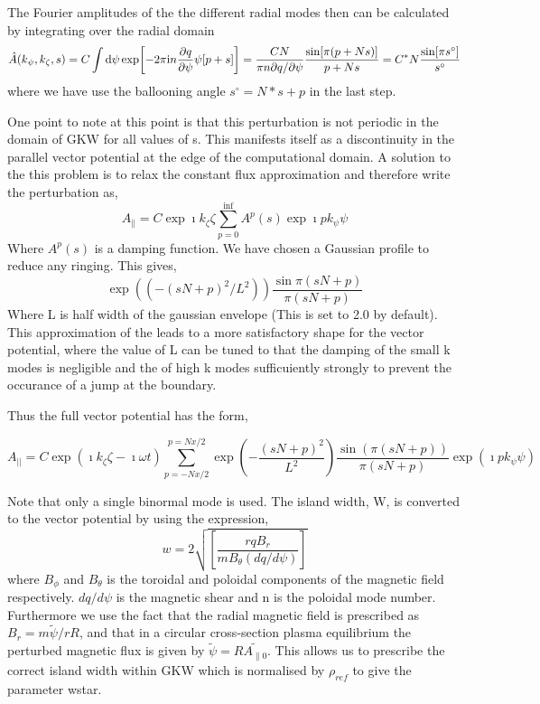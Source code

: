 \documentclass{report}
\def\be{\begin{equation}}
\def\ee{\end{equation}}
\begin{document}
The Fourier amplitudes of the the different radial modes then can be calculated by integrating over 
the radial domain 
\be 
\hat{A}(k_\psi, k_\zeta, s) = C \int {\rm d} \psi \exp \biggl [ - 2 \pi {\rm i} n {\partial q \over \partial \psi}
\psi [ p + s] \biggr ] 
= {C N \over \pi n \partial q / \partial \psi} {\sin [ \pi (p + Ns) ] \over p + Ns } 
= C^*N {\sin [ \pi s^\circ ] \over s^\circ} 
\ee 
where we have use the ballooning angle $s^\circ = N*s + p$ in the last step.

One point to note at this point is that this perturbation is not periodic in the domain of GKW for all values of s.  This manifests itself as a discontinuity in the parallel vector potential at the edge of the computational domain.  A solution to the this problem is to relax the constant flux approximation and therefore write the perturbation as,
\be 
A_\parallel = C \exp{\imath k_{\zeta}\zeta}\sum_{p=0}^{\inf} A^{p}(s)\exp{\imath pk_{\psi}\psi}
\ee  
Where $A^{p}(s)$ is a damping function.  We have chosen a Gaussian profile to reduce any ringing.  This gives,
\be
\exp{\left((-(sN+p)^{2}/L^{2})\right)}\frac{\sin{\pi(sN+p)}}{\pi(sN+p)}
\ee
Where L is half width of the gaussian envelope (This is set to 2.0 by default).  This approximation of the leads to a more satisfactory shape for the vector potential, where the value of L can be tuned to that the damping of the small k modes is negligible and the of high k modes sufficuiently strongly to prevent the occurance of a jump at the boundary.

Thus the full vector potential has the form,

\be
A_{||} = C\exp{(\imath k_{\zeta}\zeta - \imath\omega t)}\sum_{p=-Nx/2}^{p=Nx/2}\exp{\left(-\frac{(sN+p)^2}{L^2}\right)}\frac{\sin{(\pi(sN+p))}}{\pi(sN+p)}\exp{(\imath p k_{\psi}\psi)}
\ee

Note that only a single binormal mode is used.  The island width, W, is converted to the vector potential by using the expression,
\be
w = 2\sqrt{\left[\frac{rqB_{r}}{mB_{\theta}(dq/d\psi)}\right]}
\ee
where $B_{\phi}$ and $B_{\theta}$ is the toroidal and poloidal components of the magnetic field respectively.  $dq/d\psi$ is the magnetic shear and n is the poloidal mode number.  Furthermore we use the fact that the radial magnetic field is prescribed as $B_{r}= m\tilde{\psi} /rR$, and that in a circular cross-section plasma equilibrium the perturbed magnetic flux is given by $\tilde{\psi} = R\tilde{A_{\parallel 0}}$.  This allows us to prescribe the correct island width within GKW which is normalised by $\rho_{ref}$ to give the parameter wstar.
\end{document}
